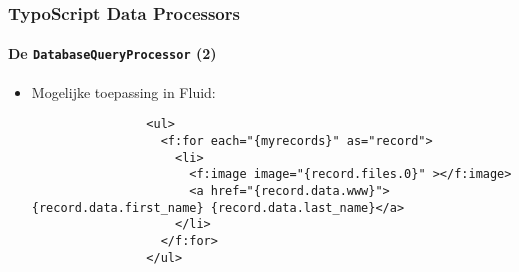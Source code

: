 \begin{frame}[fragile]
	\frametitle{TypoScript Data Processors}
	\framesubtitle{De \texttt{DatabaseQueryProcessor} (2)}

	\lstset{basicstyle=\tiny\ttfamily}

	\begin{itemize}

		\item Mogelijke toepassing in Fluid:

			\begin{lstlisting}
				<ul>
				  <f:for each="{myrecords}" as="record">
				    <li>
				      <f:image image="{record.files.0}" ></f:image>
				      <a href="{record.data.www}">{record.data.first_name} {record.data.last_name}</a>
				    </li>
				  </f:for>
				</ul>
			\end{lstlisting}

	\end{itemize}

\end{frame}

